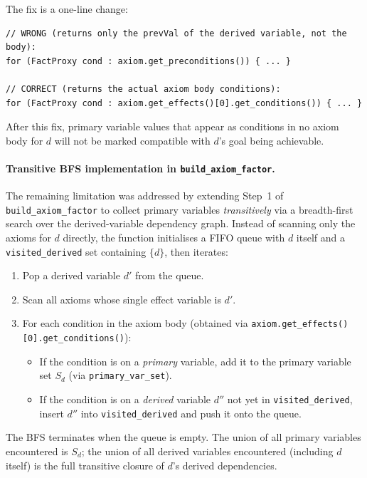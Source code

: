 \documentclass[11pt,a4paper]{article}
\begin{document}
The fix is a one-line change:
\begin{lstlisting}[caption={Fix PrimaryRepresentation to use effect conditions for axiom body}]
// WRONG (returns only the prevVal of the derived variable, not the body):
for (FactProxy cond : axiom.get_preconditions()) { ... }

// CORRECT (returns the actual axiom body conditions):
for (FactProxy cond : axiom.get_effects()[0].get_conditions()) { ... }
\end{lstlisting}
After this fix, primary variable values that appear as conditions in no axiom
body for $d$ will not be marked compatible with $d$'s goal being achievable.

\paragraph{Transitive BFS implementation in \texttt{build\_axiom\_factor}.}

The remaining limitation was addressed by extending Step~1 of
\texttt{build\_axiom\_factor} to collect primary variables \emph{transitively}
via a breadth-first search over the derived-variable dependency graph.  Instead
of scanning only the axioms for $d$ directly, the function initialises a FIFO
queue with $d$ itself and a \texttt{visited\_derived} set containing $\{d\}$,
then iterates:

\begin{enumerate}
  \item Pop a derived variable $d'$ from the queue.
  \item Scan all axioms whose single effect variable is $d'$.
  \item For each condition in the axiom body (obtained via
        \texttt{axiom.get\_effects()[0].get\_conditions()}):
    \begin{itemize}
      \item If the condition is on a \emph{primary} variable, add it to the
            primary variable set $S_d$ (via \texttt{primary\_var\_set}).
      \item If the condition is on a \emph{derived} variable $d''$ not yet
            in \texttt{visited\_derived}, insert $d''$ into
            \texttt{visited\_derived} and push it onto the queue.
    \end{itemize}
\end{enumerate}

The BFS terminates when the queue is empty.  The union of all primary variables
encountered is $S_d$; the union of all derived variables encountered (including
$d$ itself) is the full transitive closure of $d$'s derived dependencies.
\end{document}
